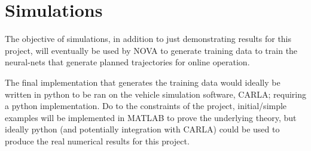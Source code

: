 \documentclass[9pt, onecolumn]{report}
\begin{document}
\section*{Simulations}
The objective of simulations, in addition to just demonstrating results for this project, will eventually be used by NOVA to generate training data to train the neural-nets that generate planned trajectories for online operation.

The final implementation that generates the training data would ideally be written in python to be ran on the vehicle simulation software, CARLA; requiring a python implementation.
Do to the constraints of the project, initial/simple examples will be implemented in MATLAB to prove the underlying theory, but ideally python (and potentially integration with CARLA) could be used to produce the real numerical results for this project.


\newpage
\appendix


\end{document}
